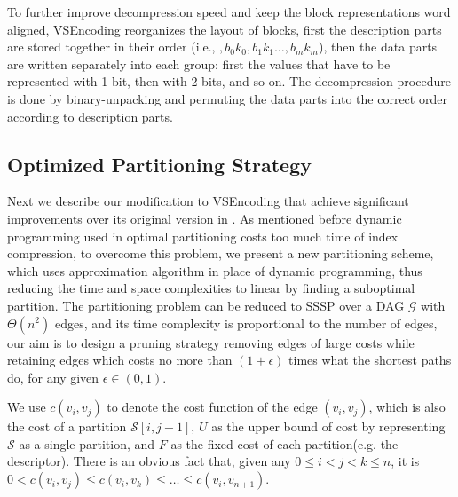 \documentclass[runningheads,a4paper]{llncs}
\begin{document}
To further improve decompression speed and keep the block representations word aligned, VSEncoding reorganizes the layout of blocks, first the description parts are stored together in their order (i.e., $,b_{0}k_{0},b_{1}k_{1}\dots,b_{m}k_{m}$), then the data parts are written separately into each group: first the values that have to be represented with 1 bit, then with 2 bits, and so on. The decompression procedure is done by binary-unpacking and permuting the data parts into the correct order according to description parts.

\subsection{Optimized Partitioning Strategy}

Next we describe our modification to VSEncoding that achieve significant improvements over its original version in \cite{silvestri2010vsencoding}. As mentioned before dynamic programming used in optimal partitioning costs too much time of index compression, to overcome this problem, we present a new partitioning scheme, which uses approximation algorithm in place of dynamic programming, thus reducing the time and space complexities to linear by finding a suboptimal partition. The partitioning problem can be reduced  to SSSP over a DAG $\mathcal{G}$ with $\Theta\left(n^{2}\right)$ edges, and its time complexity is proportional to the number of edges,
our aim is to design a pruning strategy removing edges of large costs while retaining edges which costs no more than $\left(1+\epsilon \right)$ times what the shortest paths do, for any given $\epsilon\in\left(0,1\right)$.

We use $c\left(v_{i},v_{j}\right)$ to denote the cost function of the edge $\left(v_{i},v_{j}\right)$, which is also the cost of a partition  $\mathcal{S}\left[i,j-1 \right]$, $U$ as the upper bound of cost by representing $\mathcal{S}$ as a single partition, and $F$ as the fixed cost of each partition(e.g. the descriptor). There is an obvious fact that, given any $0\leqslant i < j < k \leqslant n$, it is $ 0 < c\left(v_{i},v_{j}\right)\leqslant c\left(v_{i},v_{k}\right)\leqslant \ldots \leqslant c\left(v_{i},v_{n+1}\right)$.
\end{document}

